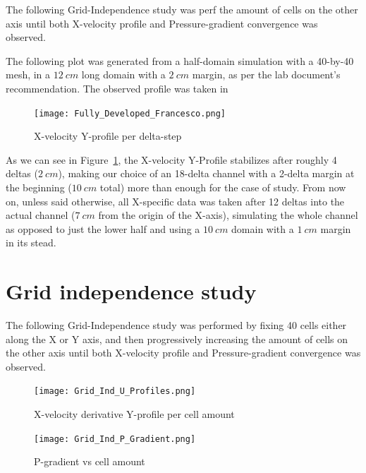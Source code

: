 \documentclass[12pt]{article}
\begin{document}
The following Grid-Independence study was perf the amount of cells on the other axis until both X-velocity profile and Pressure-gradient convergence was observed.
        
        The following plot was generated from a half-domain simulation with a 40-by-40 mesh, in a $ 12 \: cm $ long domain with a $ 2 \: cm $ margin, as per the lab document's recommendation. The observed profile was taken in

        \begin{figure}[!ht]
                \texttt{[image: Fully\_Developed\_Francesco.png]}
                \centering
                \caption{X-velocity Y-profile per delta-step}
                \label{fig:delta-steps}
        \end{figure}

        As we can see in Figure~\ref{fig:delta-steps}, the X-velocity Y-Profile stabilizes after roughly 4 deltas ($ 2 \: cm $), making our choice of an 18-delta channel with a 2-delta margin at the beginning ($ 10 \: cm $ total) more than enough for the case of study. From now on, unless said otherwise, all X-specific data was taken after 12 deltas into the actual channel ($ 7 \: cm $ from the origin of the X-axis), simulating the whole channel as opposed to just the lower half and using a \( 10 \: cm \) domain with a \( 1 \: cm \) margin in its stead.

\section{Grid independence study} \label{sec:independence}

        The following Grid-Independence study was performed by fixing 40 cells either along the X or Y axis, and then progressively increasing the amount of cells on the other axis until both X-velocity profile and Pressure-gradient convergence was observed.

        \begin{figure}[!ht]
                \texttt{[image: Grid\_Ind\_U\_Profiles.png]}
                \centering
                \caption{X-velocity derivative Y-profile per cell amount}
                \label{fig:grid_ind_u}
        \end{figure}

        \begin{figure}[!ht]
                \texttt{[image: Grid\_Ind\_P\_Gradient.png]}
                \centering
                \caption{P-gradient vs cell amount}
                \label{fig:grid_ind_p}
        \end{figure}
\end{document}
